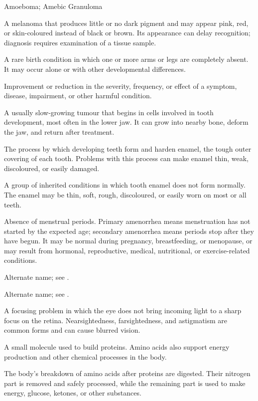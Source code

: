 \synonyms
Amoeboma; Amebic Granuloma

 A melanoma that produces little or no dark pigment and may appear pink, red, or skin-coloured instead of black or brown. Its appearance can delay recognition; diagnosis requires examination of a tissue sample.

 A rare birth condition in which one or more arms or legs are completely absent. It may occur alone or with other developmental differences.

 Improvement or reduction in the severity, frequency, or effect of a symptom, disease, impairment, or other harmful condition.

 A usually slow-growing tumour that begins in cells involved in tooth development, most often in the lower jaw. It can grow into nearby bone, deform the jaw, and return after treatment.

 The process by which developing teeth form and harden enamel, the tough outer covering of each tooth. Problems with this process can make enamel thin, weak, discoloured, or easily damaged.

 A group of inherited conditions in which tooth enamel does not form normally. The enamel may be thin, soft, rough, discoloured, or easily worn on most or all teeth.

 Absence of menstrual periods. Primary amenorrhea means menstruation has not started by the expected age; secondary amenorrhea means periods stop after they have begun. It may be normal during pregnancy, breastfeeding, or menopause, or may result from hormonal, reproductive, medical, nutritional, or exercise-related conditions.

 Alternate name; see .

 Alternate name; see .

 A focusing problem in which the eye does not bring incoming light to a sharp focus on the retina. Nearsightedness, farsightedness, and astigmatism are common forms and can cause blurred vision.

 A small molecule used to build proteins. Amino acids also support energy production and other chemical processes in the body.

 The body’s breakdown of amino acids after proteins are digested. Their nitrogen part is removed and safely processed, while the remaining part is used to make energy, glucose, ketones, or other substances.

